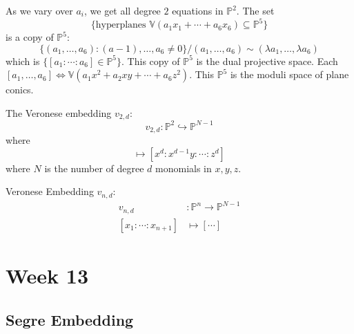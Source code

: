 \documentclass{report}
\begin{document}
As we vary over $a_{i}$, we get all degree $2$ equations in $\mathbb{P}^{2}$. The set 
    \begin{equation*}
        \{\text{hyperplanes $\mathbb{V}(a_{1}x_{1} + \cdots + a_{6}x_{6})$}\subseteq \mathbb{P}^{5}\} 
    \end{equation*}
is a copy of $\mathbb{P}^{5}$:
    \begin{equation*}
        \{(a_{1}, \ldots, a_{6}) : (a-1), \ldots, a_{6} \neq 0\} /(a_{1}, \ldots, a_{6}) \sim (\lambda a_{1}, \ldots, \lambda a_{6})
    \end{equation*}
which is $\{[a_{1} : \cdots : a_{6}] \in \mathbb{P}^{5}\}$. This copy of $\mathbb{P}^{5}$ is the dual projective space. Each $[a_{1}, \ldots, a_{6}] \iff \mathbb{V}(a_{1}x^{2} + a_{2}xy+ \cdots + a_{6}z^{2})$. This $\mathbb{P}^{5}$ is the moduli space of plane conics.

The Veronese embedding $v_{2, d}$:
    \begin{equation*}
        v_{2, d} : \mathbb{P}^{2} \hookrightarrow \mathbb{P}^{N - 1}
    \end{equation*}
where
    \begin{equation*}
        [x : y : z] \mapsto [x^{d} : x^{d - 1}y : \cdots : z^{d}]
    \end{equation*}
where $N$ is the number of degree $d$ monomials in $x, y, z$.

Veronese Embedding $v_{n, d}$:
    \begin{align*}
        v_{n, d}                     &:       \mathbb{P}^{n} \rightarrow \mathbb{P}^{N - 1} \\
        [x_{1} : \cdots : x_{n + 1}] &\mapsto  [\cdots]                                       
    \end{align*}

\chapter{Week 13}

\begin{topic}
    \section{Segre Embedding}
\end{topic}
\end{document}
